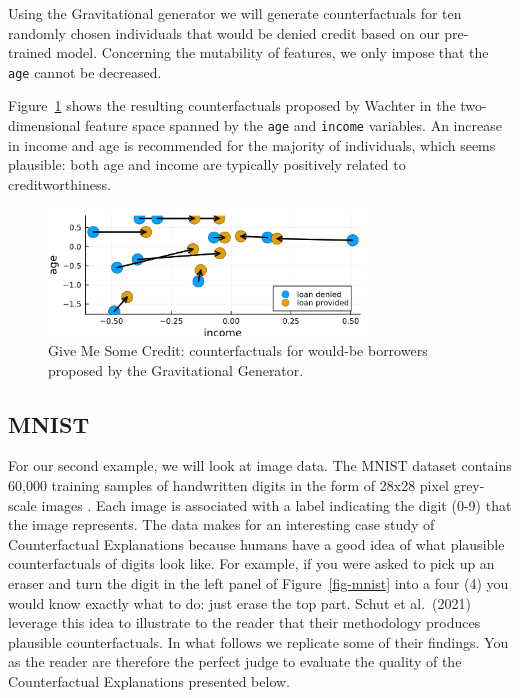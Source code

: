 \documentclass{juliacon}
\begin{document}
Using the Gravitational generator \cite{altmeyer2023endogenous} we will
generate counterfactuals for ten randomly chosen individuals that would
be denied credit based on our pre-trained model. Concerning the
mutability of features, we only impose that the \texttt{age} cannot be
decreased.

Figure~\ref{fig-credit} shows the resulting counterfactuals proposed by
Wachter in the two-dimensional feature space spanned by the \texttt{age}
and \texttt{income} variables. An increase in income and age is
recommended for the majority of individuals, which seems plausible: both
age and income are typically positively related to creditworthiness.

\begin{figure}

{\centering \includegraphics[width=3.33333in,height=1.33333in]{www/credit.png}

}

\caption{\label{fig-credit}Give Me Some Credit: counterfactuals for
would-be borrowers proposed by the Gravitational Generator.}

\end{figure}

\hypertarget{mnist}{%
\subsection{MNIST}\label{mnist}}

For our second example, we will look at image data. The MNIST dataset
contains 60,000 training samples of handwritten digits in the form of
28x28 pixel grey-scale images \cite{lecun1998mnist}. Each image is
associated with a label indicating the digit (0-9) that the image
represents. The data makes for an interesting case study of
Counterfactual Explanations because humans have a good idea of what
plausible counterfactuals of digits look like. For example, if you were
asked to pick up an eraser and turn the digit in the left panel of
Figure~\ref{fig-mnist} into a four (4) you would know exactly what to
do: just erase the top part. Schut et al.~(2021)
\cite{schut2021generating} leverage this idea to illustrate to the
reader that their methodology produces plausible counterfactuals. In
what follows we replicate some of their findings. You as the reader are
therefore the perfect judge to evaluate the quality of the
Counterfactual Explanations presented below.
\end{document}
